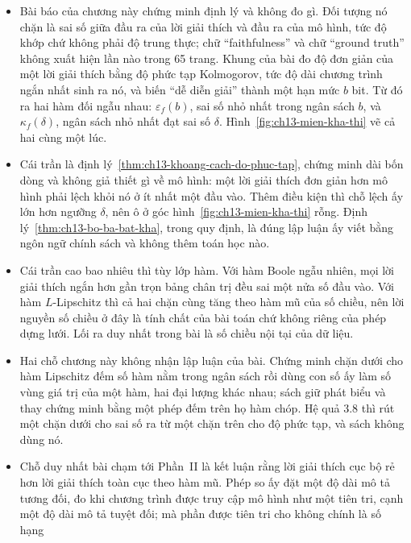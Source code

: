 \begin{tomtat}
\begin{itemize}
  \item Bài báo của chương này chứng minh định lý và không đo gì. Đối tượng nó
  chặn là sai số giữa đầu ra của lời giải thích và đầu ra của mô hình, tức độ
  khớp chứ không phải độ trung thực; chữ \enquote{faithfulness} và chữ
  \enquote{ground truth} không xuất hiện lần nào trong 65 trang. Khung của bài
  đo độ đơn giản của một lời giải thích bằng độ phức tạp
  Kolmogorov, tức độ dài chương trình ngắn nhất sinh ra nó, và biến
  \enquote{dễ diễn giải} thành một hạn mức $b$ bit. Từ đó ra hai hàm đối ngẫu
  nhau: $\varepsilon_f(b)$, sai số nhỏ nhất trong ngân sách $b$, và
  $\kappa_f(\delta)$, ngân sách nhỏ nhất đạt sai số $\delta$.
  Hình~\ref{fig:ch13-mien-kha-thi} vẽ cả hai cùng một lúc.
  \item Cái trần là định lý~\ref{thm:ch13-khoang-cach-do-phuc-tap}, chứng minh
  dài bốn dòng và không giả thiết gì về mô hình: một lời giải thích đơn giản hơn
  mô hình phải lệch khỏi nó ở ít nhất một đầu vào. Thêm điều kiện
  thì chỗ lệch ấy lớn hơn ngưỡng $\delta$, nên ô ở góc
  hình~\ref{fig:ch13-mien-kha-thi} rỗng. Định lý~\ref{thm:ch13-bo-ba-bat-kha},
   trong quy định, là đúng lập luận ấy viết bằng
  ngôn ngữ chính sách và không thêm toán học nào.
  \item Cái trần cao bao nhiêu thì tùy lớp hàm. Với hàm Boole ngẫu nhiên, mọi
  lời giải thích ngắn hơn gần trọn bảng chân trị đều sai một nửa số đầu vào. Với
  hàm $L$-Lipschitz thì cả hai chặn cùng tăng theo hàm mũ của số chiều, nên lời
  nguyền số chiều ở đây là tính chất của bài toán chứ không riêng của phép dựng
  lưới. Lối ra duy nhất trong bài là số chiều nội tại của dữ liệu.
  \item Hai chỗ chương này không nhận lập luận của bài. Chứng minh chặn dưới cho
  hàm Lipschitz đếm số hàm nằm trong ngân sách rồi dùng con số ấy làm số vùng
  giá trị của một hàm, hai đại lượng khác nhau; sách giữ phát biểu và thay chứng
  minh bằng một phép đếm trên họ hàm chóp. Hệ quả 3.8 thì rút một chặn dưới cho
  sai số ra từ một chặn trên cho độ phức tạp, và sách không dùng nó.
  \item Chỗ duy nhất bài chạm tới Phần~II là kết luận rằng lời giải thích cục bộ
  rẻ hơn lời giải thích toàn cục theo hàm mũ. Phép so ấy đặt một độ dài mô tả
  tương đối, đo khi chương trình được truy cập mô hình như một tiên tri, cạnh
  một độ dài mô tả tuyệt đối; mà phần được tiên tri cho không chính là số hạng

\end{itemize}
\end{tomtat}
